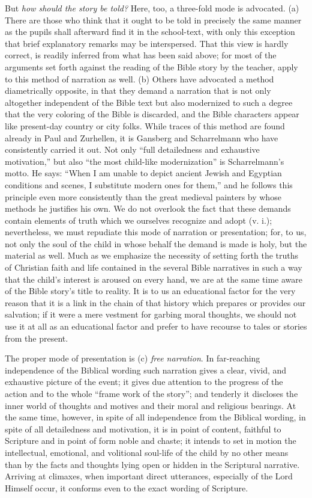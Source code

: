 But \emph{how should the story be told?} Here, too, a three-fold mode is advocated. (a) There are those who think that it ought to be told in precisely the same manner as the pupils shall afterward find it in the school-text, with only this exception that brief explanatory remarks may be interspersed. That this view is hardly correct, is readily inferred from what has been said above; for most of the arguments set forth against the reading of the Bible story by the teacher, apply to this method of narration as well. (b) Others have advocated a method diametrically opposite, in that they demand a narration that is not only altogether independent of the Bible text but also modernized to such a degree that the very coloring of the Bible is discarded, and the Bible characters appear like present-day country or city folks. While traces of this method are found already in Paul and Zurhellen, it is Gansberg and Scharrelmann who have consistently carried it out. Not only “full detailedness and exhaustive motivation,” but also “the most child-like modernization” is Scharrelmann’s motto. He says: “When I am unable to depict ancient Jewish and Egyptian conditions and scenes, I substitute modern ones for them,” and he follows this principle even more consistently than the great medieval painters by whose methods he justifies his own. We do not
overlook the fact that these demands contain elements of truth which we ourselves recognize and adopt (v. i.); nevertheless, we must repudiate this mode of narration or presentation; for, to us, not only the soul of the child in whose behalf the demand is made is holy, but the material as well. Much as we emphasize the necessity of setting forth the truths of Christian faith and life contained in the several Bible narratives in such a way that the child’s interest is aroused on every hand, we are at the same time aware of the Bible story’s title to reality. It is to us an educational factor for the very reason that it is a link in the chain of that history which prepares or provides our salvation; if it were a mere vestment for garbing moral thoughts, we should not use it at all as an educational factor and prefer to have recourse to tales or stories from the present.

The proper mode of presentation is (c) \emph{free narration}. In far-reaching independence of the Biblical wording such narration gives a clear, vivid, and exhaustive picture of the event; it gives due attention to the progress of the action and to the whole “frame work of the story”; and tenderly it discloses the inner world of thoughts and motives and their moral and religious bearings. At the same time, however, in spite of all independence from the Biblical wording, in spite of all detailedness and motivation, it is in point of content, faithful to Scripture and in point of form noble and chaste; it intends to set in motion the intellectual, emotional, and volitional soul-life of the child by no other means than by the facts and thoughts lying open or hidden in the Scriptural narrative. Arriving at climaxes, when important direct utterances, especially of the Lord Himself occur, it conforms even to the exact wording of Scripture.

